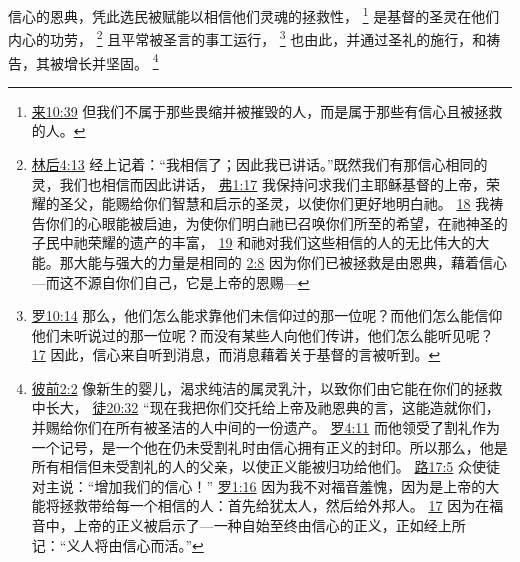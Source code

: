 \documentclass[12pt, a4paper, oneside]{ctexart}
\newcounter{parnum}[section]
\newcommand{\N}{%
   \noindent\refstepcounter{parnum}%
    \makebox[\parindent][l]{\textbf{\arabic{parnum}.}}}
\begin{document}
\N 信心的恩典，凭此选民被赋能以相信他们灵魂的拯救性，
	\footnote {
		\href{https://biblehub.com/hebrews/10-39.htm}{来10:39} 但我们不属于那些畏缩并被摧毁的人，而是属于那些有信心且被拯救的人。
	}
	是基督的圣灵在他们内心的功劳，
	\footnote {
		\href{https://biblehub.com/2_corinthians/4-13.htm}{林后4:13} 经上记着：“我相信了；因此我已讲话。”既然我们有那信心相同的灵，我们也相信而因此讲话，
		\href{https://biblehub.com/ephesians/1-17.htm}{弗1:17} 我保持问求我们主耶稣基督的上帝，荣耀的圣父，能赐给你们智慧和启示的圣灵，以使你们更好地明白祂。
		\href{https://biblehub.com/ephesians/1-18.htm}{18} 我祷告你们的心眼能被启迪，为使你们明白祂已召唤你们所至的希望，在祂神圣的子民中祂荣耀的遗产的丰富，
		\href{https://biblehub.com/ephesians/1-19.htm}{19} 和祂对我们这些相信的人的无比伟大的大能。那大能与强大的力量是相同的
		\href{https://biblehub.com/ephesians/2-8.htm}{2:8} 因为你们已被拯救是由恩典，藉着信心---而这不源自你们自己，它是上帝的恩赐---
	}
	且平常被圣言的事工运行，
	\footnote {
		\href{https://biblehub.com/romans/10-14.htm}{罗10:14} 那么，他们怎么能求靠他们未信仰过的那一位呢？而他们怎么能信仰他们未听说过的那一位呢？而没有某些人向他们传讲，他们怎么能听见呢？
		\href{https://biblehub.com/romans/10-17.htm}{17} 因此，信心来自听到消息，而消息藉着关于基督的言被听到。
	}
	也由此，并通过圣礼的施行，和祷告，其被增长并坚固。
	\footnote {
		\href{https://biblehub.com/1_peter/2-2.htm}{彼前2:2} 像新生的婴儿，渴求纯洁的属灵乳汁，以致你们由它能在你们的拯救中长大，
		\href{https://biblehub.com/acts/20-32.htm}{徒20:32} “现在我把你们交托给上帝及祂恩典的言，这能造就你们，并赐给你们在所有被圣洁的人中间的一份遗产。
		\href{https://biblehub.com/romans/4-11.htm}{罗4:11} 而他领受了割礼作为一个记号，是一个他在仍未受割礼时由信心拥有正义的封印。所以那么，他是所有相信但未受割礼的人的父亲，以使正义能被归功给他们。
		\href{https://biblehub.com/luke/17-5.htm}{路17:5} 众使徒对主说：“增加我们的信心！”
		\href{https://biblehub.com/romans/1-16.htm}{罗1:16} 因为我不对福音羞愧，因为是上帝的大能将拯救带给每一个相信的人：首先给犹太人，然后给外邦人。
		\href{https://biblehub.com/romans/1-17.htm}{17} 因为在福音中，上帝的正义被启示了---一种自始至终由信心的正义，正如经上所记：“义人将由信心而活。”
	}
\end{document}
